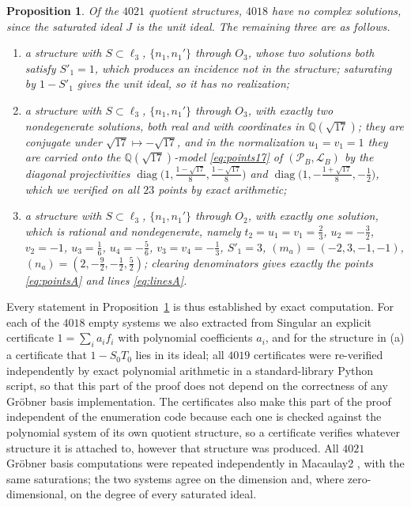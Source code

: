 \documentclass[11pt]{article}
\theoremstyle{plain}
\newtheorem{proposition}[theorem]{Proposition}
\theoremstyle{definition}
\newcommand{\QQ}{\mathbb{Q}}
\newcommand{\cP}{\mathcal{P}}
\newcommand{\cL}{\mathcal{L}}
\begin{document}
\begin{proposition}\label{prop:solve}
Of the $4021$ quotient structures, $4018$ have no complex solutions, since the saturated ideal $J$ is the unit ideal.  The remaining three are as follows.
\begin{enumerate}
\item[(a)] a structure with $S\subset\ell_3$, $\{n_1,n_1'\}$ through $O_3$, whose two solutions both satisfy $S'_1=1$, which produces an incidence not in the structure; saturating by $1-S'_1$ gives the unit ideal, so it has no realization;
\item[(b)] a structure with $S\subset\ell_3$, $\{n_1,n_1'\}$ through $O_3$, with exactly two nondegenerate solutions, both real and with coordinates in $\QQ(\sqrt{17})$; they are conjugate under $\sqrt{17}\mapsto-\sqrt{17}$, and in the normalization $u_1=v_1=1$ they are carried onto the $\QQ(\sqrt{17})$-model \eqref{eq:points17} of $(\cP_B,\cL_B)$ by the diagonal projectivities $\operatorname{diag}\bigl(1,\tfrac{1-\sqrt{17}}{8},\tfrac{1-\sqrt{17}}{8}\bigr)$ and $\operatorname{diag}\bigl(1,-\tfrac{1+\sqrt{17}}{8},-\tfrac12\bigr)$, which we verified on all $23$ points by exact arithmetic;
\item[(c)] a structure with $S\subset\ell_3$, $\{n_1,n_1'\}$ through $O_2$, with exactly one solution, which is rational and nondegenerate, namely
$t_2=u_1=v_1=\tfrac23$, $u_2=-\tfrac32$, $v_2=-1$, $u_3=\tfrac16$, $u_4=-\tfrac56$, $v_3=v_4=-\tfrac13$, $S'_1=3$, $(m_a)=(-2,3,-1,-1)$, $(n_a)=(2,-\tfrac92,-\tfrac12,\tfrac52)$; clearing denominators gives exactly the points \eqref{eq:pointsA} and lines \eqref{eq:linesA}.
\end{enumerate}
\end{proposition}

Every statement in Proposition~\ref{prop:solve} is thus established by exact computation.  For each of the $4018$ empty systems we also extracted from Singular an explicit certificate $1=\sum_i a_if_i$ with polynomial coefficients $a_i$, and for the structure in (a) a certificate that $1-S_0T_0$ lies in its ideal; all $4019$ certificates were re-verified independently by exact polynomial arithmetic in a standard-library Python script, so that this part of the proof does not depend on the correctness of any Gr\"obner basis implementation.  The certificates also make this part of the proof independent of the enumeration code because each one is checked against the polynomial system of its own quotient structure, so a certificate verifies whatever structure it is attached to, however that structure was produced.  All $4021$ Gr\"obner basis computations were repeated independently in Macaulay2 \cite{M2}, with the same saturations; the two systems agree on the dimension and, where zero-dimensional, on the degree of every saturated ideal.
\end{document}
